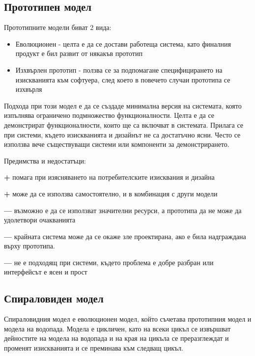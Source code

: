 \documentclass[fleqn,12pt]{article}
\begin{document}
\subsection{Прототипен модел}
Прототипните модели биват 2 вида:

\begin{itemize}
	\item Еволюционен - целта е да се достави работеща система, като финалния продукт е бил развит от някакъв прототип
	\item Изхвърлен прототип - ползва се за подпомагане специфицирането на изискванията към софтуера, след което в повечето случаи прототипа се изхвърля
\end{itemize}

Подхода при този модел е да се създаде минимална версия на системата, която изпълнява ограничено подмножество функционалности. Целта е да се демонстрират функционалности, които ще са включват в системата. Прилага се при системи, където изискванията и дизайнът не са достатъчно ясни. Често се използва вече съществуващи системи или компоненти за демонстрирането.

Предимства и недостатъци:
\begin{description}
	\item \textbf{+} помага при изясняването на потребителските изисквания и дизайна
	\item \textbf{+} може да се използва самостоятелно, и в комбинация с други модели
	\item \textbf{---} възможно е да се използват значителни ресурси, а прототипа да не може да удолетвори очакванията
	\item \textbf{---} крайната система може да се окаже зле проектирана, ако е била надграждана върху прототипа.
	\item \textbf{---} не е подходящ при системи, където проблема е добре разбран или интерфейсът е ясен и прост
\end{description}

\subsection{Спираловиден модел}
Спираловидния модел е еволюционен модел, който съчетава прототипния модел и модела на водопада. Модела е цикличен, като на всеки цикъл се извършват дейностите на модела на водопада и на края на цикъла се преразглеждат и променят изискванията и се преминава към следващ цикъл.
\end{document}
